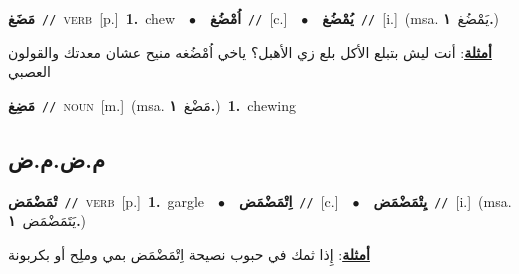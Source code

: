 \documentclass[10pt,a4paper,twoside]{article} %
\begin{document}
\begin{multicols}{2}
{\setlength\topsep{0pt}\textbf{\foreignlanguage{arabic}{مَضَغ}}\ {\color{gray}\texttt{//}\color{black}}\ \textsc{verb}\ [p.]\ \textbf{1.}~chew\ \ $\bullet$\ \ \setlength\topsep{0pt}\textbf{\foreignlanguage{arabic}{اُمْضُغ}}\ {\color{gray}\texttt{//}\color{black}}\ [c.]\ \ $\bullet$\ \ \setlength\topsep{0pt}\textbf{\foreignlanguage{arabic}{يُمْضُغ}}\ {\color{gray}\texttt{//}\color{black}}\ [i.]\ \color{gray}(msa. \foreignlanguage{arabic}{يَمْضُغ}~\foreignlanguage{arabic}{\textbf{١.}})\color{black}\  \begin{flushright}\color{gray}\foreignlanguage{arabic}{\textbf{\underline{\foreignlanguage{arabic}{أمثلة}}}: أنت ليش بتبلع الأكل بلع زي الأهبل؟ ياخي اُمْضُغه منيح عشان معدتك والقولون العصبي}\end{flushright}\color{black}} \vspace{2mm}

{\setlength\topsep{0pt}\textbf{\foreignlanguage{arabic}{مَضِغ}}\ {\color{gray}\texttt{//}\color{black}}\ \textsc{noun}\ [m.]\ \color{gray}(msa. \foreignlanguage{arabic}{مَضْغ}~\foreignlanguage{arabic}{\textbf{١.}})\color{black}\ \textbf{1.}~chewing\ } \vspace{2mm}

\vspace{-3mm}
\subsection*{\color{blue}\foreignlanguage{arabic}{م.ض.م.ض}\color{blue}{}} 

{\setlength\topsep{0pt}\textbf{\foreignlanguage{arabic}{تْمَضْمَض}}\ {\color{gray}\texttt{//}\color{black}}\ \textsc{verb}\ [p.]\ \textbf{1.}~gargle\ \ $\bullet$\ \ \setlength\topsep{0pt}\textbf{\foreignlanguage{arabic}{اِتْمَضْمَض}}\ {\color{gray}\texttt{//}\color{black}}\ [c.]\ \ $\bullet$\ \ \setlength\topsep{0pt}\textbf{\foreignlanguage{arabic}{يِتْمَضْمَض}}\ {\color{gray}\texttt{//}\color{black}}\ [i.]\ \color{gray}(msa. \foreignlanguage{arabic}{يَتَمَضْمَض}~\foreignlanguage{arabic}{\textbf{١.}})\color{black}\  \begin{flushright}\color{gray}\foreignlanguage{arabic}{\textbf{\underline{\foreignlanguage{arabic}{أمثلة}}}: إِذا ثمك في حبوب نصيحة اِتْمَضْمَض بمي وملِح أو بكربونة}\end{flushright}\color{black}} \vspace{2mm}


\end{multicols}
\end{document}
